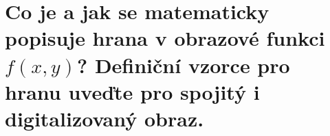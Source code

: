 \section{Co je a jak se matematicky popisuje hrana v obrazové funkci $f(x,y)$? Definiční vzorce pro hranu uveďte pro 
spojitý i digitalizovaný obraz.}